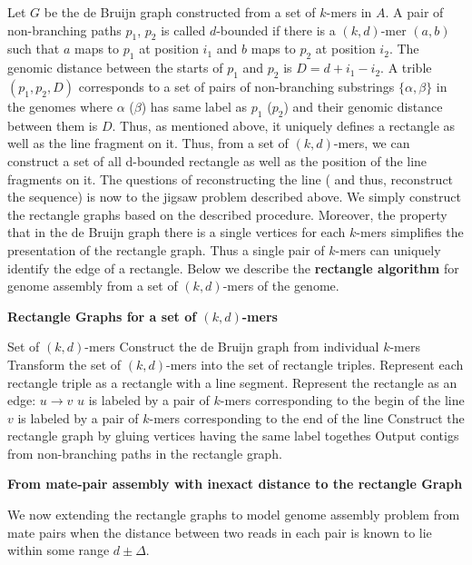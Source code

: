 \documentclass[a4paper]{article}
\begin{document}
Let $G$ be the de Bruijn graph constructed from a set of 
$k$-mers in $A$. A pair of non-branching paths $p_1$, $p_2$ is called $d$-bounded if there is a $(k,d)$-mer $(a,b)$ such that 
$a$ maps to $p_1$ at position $i_1$ and $b$ maps to $p_2$ at position $i_2$. The genomic distance between the starts 
of $p_1$ and $p_2$ is $D = d + i_1 - i_2$. A trible $(p_1, p_2, D)$ corresponds to a set of pairs of non-branching substrings 
$\{\alpha, \beta\}$ in the genomes where $\alpha$ ($\beta$) has same label as $p_1$ ($p_2$)  and their genomic distance between them 
is $D$. Thus, as mentioned above, it uniquely defines a rectangle as well as the line fragment on it. Thus, from a set of $(k,d)$-mers, 
 we can construct a set of all d-bounded rectangle as well as the position of the line fragments on it. 
The questions of reconstructing the line ( and thus, reconstruct the sequence) is now to the jigsaw problem described above. We simply construct the 
rectangle graphs based on the described procedure. Moreover, the property that in the de Bruijn graph there is a single vertices for each $k$-mers simplifies
the presentation of the rectangle graph. Thus a single pair of $k$-mers can uniquely identify the edge of a rectangle. Below we describe 
the \textbf{rectangle algorithm} for genome assembly from a set of $(k,d)$-mers of the genome.   


\noindent
\textbf{Rectangle Graphs for a set of $(k,d)$-mers}
\bigskip
\begin{algorithmic}[1]
\REQUIRE Set of $(k,d)$-mers 
\STATE Construct the  de Bruijn graph from individual  $k$-mers
\STATE Transform the set of $(k,d)$-mers into the set of rectangle triples. 
\STATE Represent each rectangle triple as a rectangle with a line segment.
\STATE Represent the rectangle as an edge: $u\rightarrow v$
\STATE \hspace*{0.5cm} $u$ is labeled by a pair of $k$-mers corresponding to the begin of the line
\STATE \hspace*{0.5cm} $v$ is labeled by a pair of $k$-mers corresponding to the end of the line
\STATE Construct the rectangle graph by gluing vertices having the same label togethes
\STATE Output contigs from non-branching paths in the rectangle graph.
\end{algorithmic}

\noindent
\textbf{From mate-pair assembly with inexact distance to the rectangle Graph}

We now extending the rectangle graphs to model genome assembly problem from mate pairs when the distance 
between two reads in each pair is known to lie within some range $d\pm \Delta$. 
\end{document}
